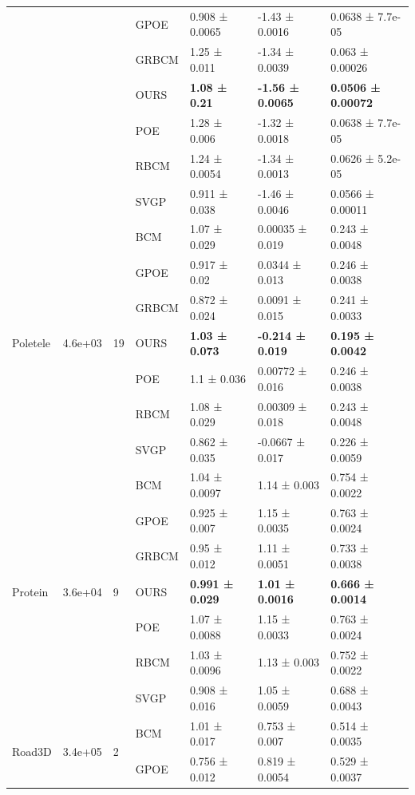 \begin{table}[ht]
\begin{tabular}{lllllll}
 &  &  & GPOE & 0.908 ± 0.0065 & -1.43 ± 0.0016 & 0.0638 ± 7.7e-05 \\
 &  &  & GRBCM & 1.25 ± 0.011 & -1.34 ± 0.0039 & 0.063 ± 0.00026 \\
 &  &  & OURS & \bfseries 1.08 ± 0.21 & \bfseries -1.56 ± 0.0065 & \bfseries 0.0506 ± 0.00072 \\
 &  &  & POE & 1.28 ± 0.006 & -1.32 ± 0.0018 & 0.0638 ± 7.7e-05 \\
 &  &  & RBCM & 1.24 ± 0.0054 & -1.34 ± 0.0013 & 0.0626 ± 5.2e-05 \\
 &  &  & SVGP & 0.911 ± 0.038 & -1.46 ± 0.0046 & 0.0566 ± 0.00011 \\
\midrule
\multirow[c]{7}{*}{Poletele} & \multirow[c]{7}{*}{4.6e+03} & \multirow[c]{7}{*}{19} & BCM & 1.07 ± 0.029 & 0.00035 ± 0.019 & 0.243 ± 0.0048 \\
 &  &  & GPOE & 0.917 ± 0.02 & 0.0344 ± 0.013 & 0.246 ± 0.0038 \\
 &  &  & GRBCM & 0.872 ± 0.024 & 0.0091 ± 0.015 & 0.241 ± 0.0033 \\
 &  &  & OURS & \bfseries 1.03 ± 0.073 & \bfseries -0.214 ± 0.019 & \bfseries 0.195 ± 0.0042 \\
 &  &  & POE & 1.1 ± 0.036 & 0.00772 ± 0.016 & 0.246 ± 0.0038 \\
 &  &  & RBCM & 1.08 ± 0.029 & 0.00309 ± 0.018 & 0.243 ± 0.0048 \\
 &  &  & SVGP & 0.862 ± 0.035 & -0.0667 ± 0.017 & 0.226 ± 0.0059 \\
\midrule
\multirow[c]{7}{*}{Protein} & \multirow[c]{7}{*}{3.6e+04} & \multirow[c]{7}{*}{9} & BCM & 1.04 ± 0.0097 & 1.14 ± 0.003 & 0.754 ± 0.0022 \\
 &  &  & GPOE & 0.925 ± 0.007 & 1.15 ± 0.0035 & 0.763 ± 0.0024 \\
 &  &  & GRBCM & 0.95 ± 0.012 & 1.11 ± 0.0051 & 0.733 ± 0.0038 \\
 &  &  & OURS & \bfseries 0.991 ± 0.029 & \bfseries 1.01 ± 0.0016 & \bfseries 0.666 ± 0.0014 \\
 &  &  & POE & 1.07 ± 0.0088 & 1.15 ± 0.0033 & 0.763 ± 0.0024 \\
 &  &  & RBCM & 1.03 ± 0.0096 & 1.13 ± 0.003 & 0.752 ± 0.0022 \\
 &  &  & SVGP & 0.908 ± 0.016 & 1.05 ± 0.0059 & 0.688 ± 0.0043 \\
\midrule
\multirow[c]{7}{*}{Road3D} & \multirow[c]{7}{*}{3.4e+05} & \multirow[c]{7}{*}{2} & BCM & 1.01 ± 0.017 & 0.753 ± 0.007 & 0.514 ± 0.0035 \\
 &  &  & GPOE & 0.756 ± 0.012 & 0.819 ± 0.0054 & 0.529 ± 0.0037 \\

\end{tabular}
\end{table}
